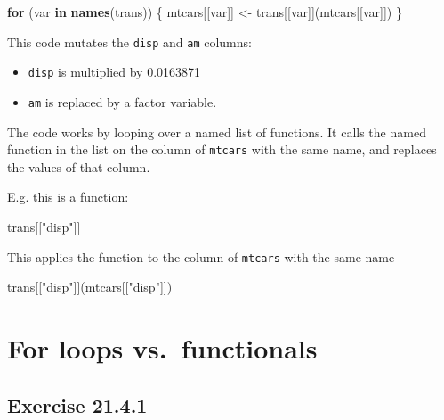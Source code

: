 \documentclass[]{book}
\newenvironment{Shaded}{\begin{snugshade}}{\end{snugshade}}
\newcommand{\ControlFlowTok}[1]{\textcolor[rgb]{0.13,0.29,0.53}{\textbf{#1}}}
\newcommand{\KeywordTok}[1]{\textcolor[rgb]{0.13,0.29,0.53}{\textbf{#1}}}
\newcommand{\NormalTok}[1]{#1}
\newcommand{\StringTok}[1]{\textcolor[rgb]{0.31,0.60,0.02}{#1}}
\providecommand{\tightlist}{%
  \setlength{\itemsep}{0pt}\setlength{\parskip}{0pt}}
\theoremstyle{plain}
\theoremstyle{remark}
\theoremstyle{definition}
\theoremstyle{definition}
\theoremstyle{definition}
\theoremstyle{remark}
\begin{document}
\begin{Shaded}
\begin{Highlighting}[]
\ControlFlowTok{for}\NormalTok{ (var }\ControlFlowTok{in} \KeywordTok{names}\NormalTok{(trans)) \{}
\NormalTok{  mtcars[[var]] <-}\StringTok{ }\NormalTok{trans[[var]](mtcars[[var]])}
\NormalTok{\}}
\end{Highlighting}
\end{Shaded}

This code mutates the \texttt{disp} and \texttt{am} columns:

\begin{itemize}
\tightlist
\item
  \texttt{disp} is multiplied by 0.0163871
\item
  \texttt{am} is replaced by a factor variable.
\end{itemize}

The code works by looping over a named list of functions. It calls the
named function in the list on the column of \texttt{mtcars} with the
same name, and replaces the values of that column.

E.g. this is a function:

\begin{Shaded}
\begin{Highlighting}[]
\NormalTok{trans[[}\StringTok{"disp"}\NormalTok{]]}
\end{Highlighting}
\end{Shaded}

This applies the function to the column of \texttt{mtcars} with the same
name

\begin{Shaded}
\begin{Highlighting}[]
\NormalTok{trans[[}\StringTok{"disp"}\NormalTok{]](mtcars[[}\StringTok{"disp"}\NormalTok{]])}
\end{Highlighting}
\end{Shaded}

\hypertarget{for-loops-vs.functionals}{%
\section{For loops vs.~functionals}\label{for-loops-vs.functionals}}

\hypertarget{exercise-21.4.1}{%
\subsection*{\texorpdfstring{Exercise
{21.4.1}}{Exercise 21.4.1}}\label{exercise-21.4.1}}
\end{document}

